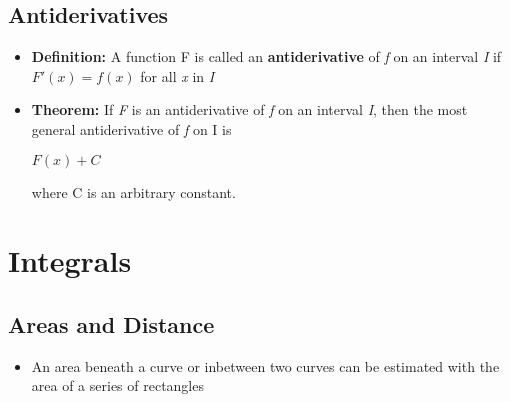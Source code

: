 \documentclass{report}
\begin{document}
		\section{Antiderivatives}
			\begin{itemize}\addtolength{\leftskip}{2em}
				\item \textbf{Definition:} A function F is called an \textbf{antiderivative} of \textit{f} on an interval \textit{I} if $F'(x)=f(x)$ for all \textit{x} in \textit{I}
				\item \textbf{Theorem: }If \textit{F} is an antiderivative of \textit{f} on an interval \textit{I}, then the most general antiderivative of \textit{f} on I is 
				\begin{center}
				$F(x)+C$
				\end{center}
				where C is an arbitrary constant.
			\end{itemize}
\chapter{Integrals}
		\section{Areas and Distance}
			\begin{itemize}\addtolength{\leftskip}{2em}
				\item An area beneath a curve or inbetween two curves can be estimated with the area of a series of rectangles
			\end{itemize}
\end{document}
